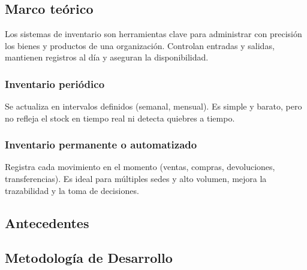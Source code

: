 \documentclass[12pt]{article} %
\begin{document}

\section*{}

\subsection*{Marco teórico}

Los sistemas de inventario son herramientas clave para administrar con precisión los bienes y productos de una organización. Controlan entradas y salidas, mantienen registros al día y aseguran la disponibilidad.

\subsubsection*{Inventario periódico}

Se actualiza en intervalos definidos (semanal, mensual). Es simple y barato, pero no refleja el stock en tiempo real ni detecta quiebres a tiempo.

\subsubsection*{Inventario permanente o automatizado}

Registra cada movimiento en el momento (ventas, compras, devoluciones, transferencias). Es ideal para múltiples sedes y alto volumen, mejora la trazabilidad y la toma de decisiones.

\subsection*{Antecedentes}




\subsection*{Metodología de Desarrollo}
\end{document}
